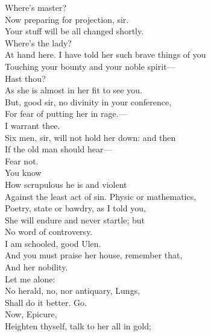 \documentclass[a4paper,oneside,12pt]{memoir}
\begin{document}
\begin{drama*}
\mammonspeaks Where's master?\\
\facespeaks {} Now preparing for projection, sir.\\
Your stuff will be all changed shortly.\\
\mammonspeaks {} Where's the lady?\\
\facespeaks At hand here. I have told her such brave things of you\\
Touching your bounty and your noble spirit---\\
\mammonspeaks Hast thou?\\
\facespeaks {} As she is almost in her fit to see you.\\
But, good sir, no divinity in your conference,\\
For fear of putting her in rage.---\\
\mammonspeaks {} I warrant thee.\\
\facespeaks Six men, sir, will not hold her down: and then\\
If the old man should hear---\\
\mammonspeaks {} Fear not.\\
\facespeaks {} You know\\
How scrupulous he is and violent\\
Against the least act of sin. Physic or mathematics,\\
Poetry, state or bawdry, as I told you,\\
She will endure and never startle; but\\
No word of controversy.\\
\mammonspeaks {} I am schooled, good Ulen.\\
\facespeaks And you must praise her house, remember that,\\
And her nobility.\\
\mammonspeaks {} Let me alone:\\
No herald, no, nor antiquary, Lungs,\\
Shall do it better. Go.\\
\mammonspeaks {} Now, Epicure,\\
Heighten thyself, talk to her all in gold;\\

\end{drama*}
\end{document}

